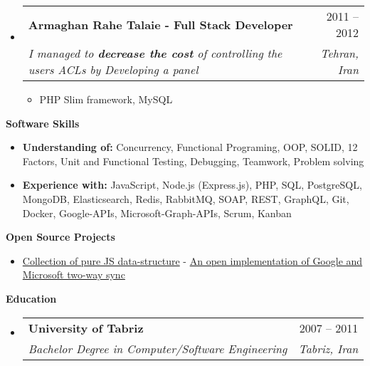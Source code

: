 \documentclass[a4paper,12pt]{article}[leftmargin=*]
\makeatletter
\def \entryspacing {-0pt}
\renewcommand{\section}[2]{\vspace{5pt}
  \colorbox{secondary}{\color{white}\raggedbottom\normalsize\textbf{{#1}{\hspace{7pt}#2}}}
}
\newcommand{\resumeEntryStart}{\begin{itemize}[leftmargin=2.5mm]}
\newcommand{\resumeEntryEnd}{\end{itemize}\vspace{\entryspacing}}
\newcommand{\resumeItemListStart}{\begin{itemize}[leftmargin=4.5mm]}
\newcommand{\resumeItemListEnd}{\end{itemize}}
\newcommand{\resumeItem}[1]{
  \item\small{
    {#1 \vspace{-2pt}}
  }
}
\newcommand{\resumeEntryTSDL}[4]{
  \vspace{-1pt}\item[]
    \begin{tabularx}{0.99\textwidth}{X@{\hspace{60pt}}r}
      \textbf{\color{primary}#1} & {\firabook\color{accent}\small#2} \\
      \textit{\color{accent}\small#3} & \textit{\color{accent}\small#4} \\
    \end{tabularx}\vspace{-7pt}
}
\newcommand{\resumeEntryS}[2]{
  \item[]\small{
    \textbf{\color{primary}#1 }{ #2 \vspace{-6pt}}
  }
}
\makeatother
\begin{document}
  \vspace{-14pt}
  \resumeEntryStart
    \resumeEntryTSDL
      {Armaghan Rahe Talaie - Full Stack Developer}{2011 -- 2012}
      {I managed to \textbf{decrease the cost} of controlling the users ACLs by Developing a panel}{Tehran, Iran}
    \resumeItemListStart
      \resumeItem {PHP Slim framework, MySQL}
    \resumeItemListEnd
  \resumeEntryEnd


\section{\faGears} {Software Skills}
 \resumeEntryStart
  \resumeEntryS
    {Understanding of:}
    {Concurrency, Functional Programing, OOP, SOLID, 12 Factors, Unit and Functional Testing, Debugging, Teamwork, Problem solving}
  
  \resumeEntryS
    {Experience with:}
    {\color{black} JavaScript, Node.js (Express.js), PHP, SQL, PostgreSQL, MongoDB, Elasticsearch, Redis, RabbitMQ, SOAP, REST, GraphQL, Git, Docker, Google-APIs, Microsoft-Graph-APIs, Scrum, Kanban}
 \resumeEntryEnd


\vspace{2pt}
\section{\faGears} {Open Source Projects}
 \resumeEntryStart
  \resumeEntryS
    {}
    {
        {\href{https://github.com/saeed-vayghan/Data-Structure}{Collection of pure JS data-structure}} -
        {\href{https://github.com/saeed-vayghan/google-microsoft-two-way-sync}{An open implementation of Google and Microsoft two-way sync}}
    }
 \resumeEntryEnd
 

\vspace{2pt}
\section{\faGraduationCap}{Education}
  \resumeEntryStart
    \vspace{-10pt}
    \resumeEntryTSDL
      {University of Tabriz}{2007 -- 2011}
      {Bachelor Degree in Computer/Software Engineering}
      {Tabriz, Iran}
  \resumeEntryEnd
\end{document}
